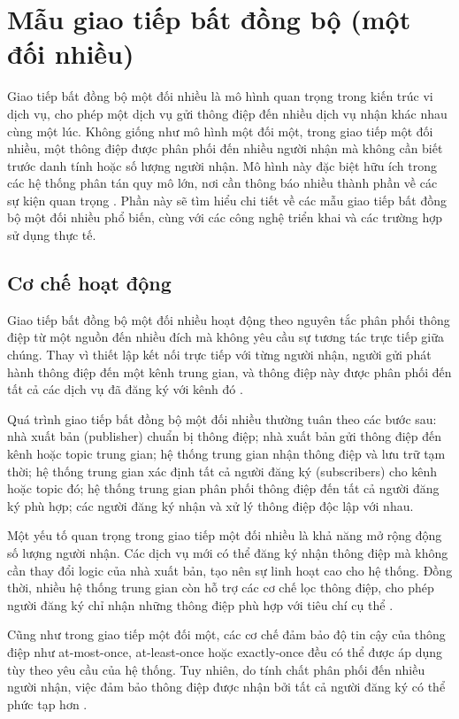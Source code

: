 \section{Mẫu giao tiếp bất đồng bộ (một đối nhiều)}
Giao tiếp bất đồng bộ một đối nhiều là mô hình quan trọng trong kiến trúc vi dịch vụ, cho phép một dịch vụ gửi thông điệp đến nhiều dịch vụ nhận khác nhau cùng một lúc. Không giống như mô hình một đối một, trong giao tiếp một đối nhiều, một thông điệp được phân phối đến nhiều người nhận mà không cần biết trước danh tính hoặc số lượng người nhận. Mô hình này đặc biệt hữu ích trong các hệ thống phân tán quy mô lớn, nơi cần thông báo nhiều thành phần về các sự kiện quan trọng \cite{newman2015}. Phần này sẽ tìm hiểu chi tiết về các mẫu giao tiếp bất đồng bộ một đối nhiều phổ biến, cùng với các công nghệ triển khai và các trường hợp sử dụng thực tế.
\subsection{Cơ chế hoạt động}
Giao tiếp bất đồng bộ một đối nhiều hoạt động theo nguyên tắc phân phối thông điệp từ một nguồn đến nhiều đích mà không yêu cầu sự tương tác trực tiếp giữa chúng. Thay vì thiết lập kết nối trực tiếp với từng người nhận, người gửi phát hành thông điệp đến một kênh trung gian, và thông điệp này được phân phối đến tất cả các dịch vụ đã đăng ký với kênh đó \cite{hohpe2004}.

Quá trình giao tiếp bất đồng bộ một đối nhiều thường tuân theo các bước sau: nhà xuất bản (publisher) chuẩn bị thông điệp; nhà xuất bản gửi thông điệp đến kênh hoặc topic trung gian; hệ thống trung gian nhận thông điệp và lưu trữ tạm thời; hệ thống trung gian xác định tất cả người đăng ký (subscribers) cho kênh hoặc topic đó; hệ thống trung gian phân phối thông điệp đến tất cả người đăng ký phù hợp; các người đăng ký nhận và xử lý thông điệp độc lập với nhau.

Một yếu tố quan trọng trong giao tiếp một đối nhiều là khả năng mở rộng động số lượng người nhận. Các dịch vụ mới có thể đăng ký nhận thông điệp mà không cần thay đổi logic của nhà xuất bản, tạo nên sự linh hoạt cao cho hệ thống. Đồng thời, nhiều hệ thống trung gian còn hỗ trợ các cơ chế lọc thông điệp, cho phép người đăng ký chỉ nhận những thông điệp phù hợp với tiêu chí cụ thể \cite{richardson2019}.

Cũng như trong giao tiếp một đối một, các cơ chế đảm bảo độ tin cậy của thông điệp như at-most-once, at-least-once hoặc exactly-once đều có thể được áp dụng tùy theo yêu cầu của hệ thống. Tuy nhiên, do tính chất phân phối đến nhiều người nhận, việc đảm bảo thông điệp được nhận bởi tất cả người đăng ký có thể phức tạp hơn \cite{aksakalli2021}.

